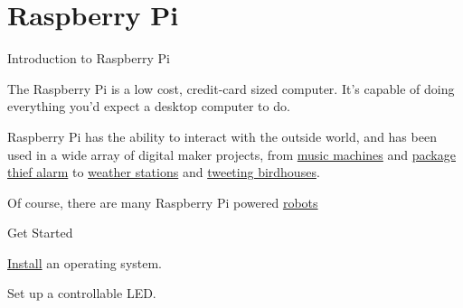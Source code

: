 \documentclass[12pt,letterpaper]{beamer}
\begin{document}
\section{Raspberry Pi}
\begin{frame}{Introduction to Raspberry Pi}
        \begin{itemize}
            {\scriptsize
            \item The Raspberry Pi is a low cost, credit-card sized computer. It’s capable of doing everything you’d expect a desktop computer to do. 
            \item Raspberry Pi  has the ability to interact with the outside world, and has been used in a wide array of digital maker projects, from \href{https://youtu.be/_nBK8sAl9nw}{music machines} and \href{https://www.raspberrypi.org/blog/deter-package-thieves-from-your-porch-with-raspberry-pi/}{package thief alarm} to \href{https://projects.raspberrypi.org/en/projects/build-your-own-weather-station}{weather stations} and \href{https://projects.raspberrypi.org/en/projects/infrared-bird-box}{tweeting birdhouses}. 
            \item Of course, there are many Raspberry Pi powered \href{https://www.google.com/search?q=raspberry+pi+robots}{robots}
            }
        \end{itemize}
     
\end{frame}

\begin{frame}{Get Started}
        \begin{itemize}
            {\small
            \item \href{https://www.raspberrypi.org/software/}{Install} an operating system. 
            \item Set up a controllable LED. 
            }
        \end{itemize}
     
\end{frame}

 
\end{document}

